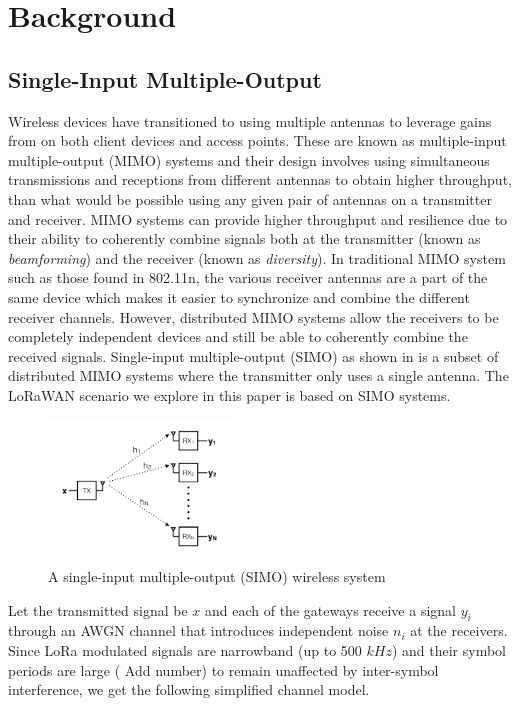 \section{Background}
\label{sec:background}

\subsection{Single-Input Multiple-Output}
\label{sec:simo}

Wireless devices have transitioned to using multiple antennas to leverage
gains from on both client devices and access points. These are known as
multiple-input multiple-output (MIMO) systems and their design involves using
simultaneous transmissions and receptions from different antennas to obtain
higher throughput, than what would be possible using any given pair of
antennas on a transmitter and receiver. MIMO systems can provide higher
throughput and resilience due to their ability to coherently combine signals
both at the transmitter (known as \textit{beamforming}) and the receiver
(known as \textit{diversity}). In traditional MIMO system such as those found
in 802.11n, the various receiver antennas are a part of the same device which
makes it easier to synchronize and combine the different receiver channels.
However, distributed MIMO systems allow the receivers to be completely
independent devices and still be able to coherently combine the received
signals. Single-input multiple-output (SIMO) as shown in  is a
subset of distributed MIMO systems where the transmitter only uses a single
antenna. The LoRaWAN scenario we explore in this paper is based on SIMO
systems.

\begin{figure}[!htb]
    \centering
    \includegraphics[width=0.45\textwidth]{figures/SIMO}
    \caption{A single-input multiple-output (SIMO) wireless system}
    \label{fig:simo}
\end{figure}

Let the transmitted signal be $x$ and each of the gateways receive a signal
$y_i$ through an AWGN channel that introduces independent noise $n_i$ at the
receivers. Since LoRa modulated signals are narrowband (up to 500 $kHz$) and
their symbol periods are large ({\color{blue} Add number}) to remain
unaffected by inter-symbol interference, we get the following simplified
channel model.

